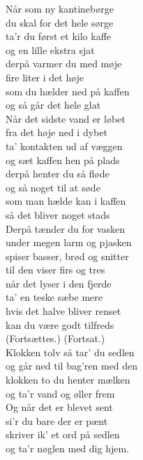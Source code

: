 Når som ny kantinebørge\\
du skal for det hele sørge\\
ta'r du først et kilo kaffe\\
og en lille ekstra sjat\\
derpå varmer du med møje\\
fire liter i det høje\\
som du hælder ned på kaffen\\
og så går det hele glat\\

Når det sidste vand er løbet\\
fra det høje ned i dybet\\
ta' kontakten ud af væggen\\
og sæt kaffen hen på plads\\
derpå henter du så fløde\\
og så noget til at søde\\
som man hælde kan i kaffen\\
så det bliver noget stads\\

Derpå tænder du for vasken\\
under megen larm og pjasken\\
spiser basser, brød og snitter\\
til den viser firs og tres\\
når det lyser i den fjerde\\
ta' en teske sæbe mere\\
hvis det halve bliver renset\\
kan du være godt tilfreds\\

(Fortsættes.)
\newpage
(Fortsat.)\\

Klokken tolv så tar' du sedlen\\
og går ned til bag'ren med den\\
klokken to du henter mælken\\
og ta'r vand og øller frem\\
Og når det er blevet sent\\
si'r du bare der er pænt\\
skriver ik' et ord på sedlen\\
og ta'r nøglen med dig hjem.\\
